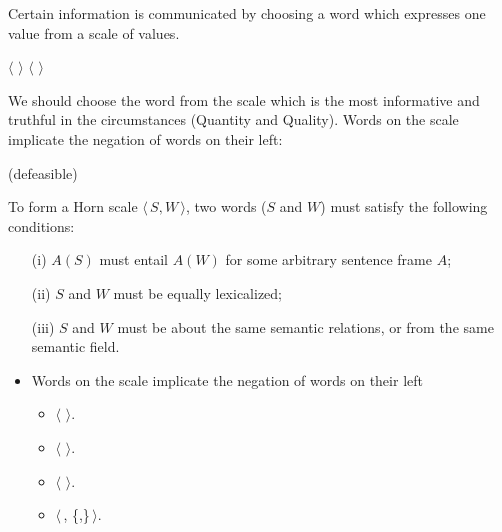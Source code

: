 \documentclass[a4paper,landscape,headrule,footrule,xetex]{foils}
\begin{document}
\newcommand{\horn}[1]{\ensuremath{\langle}\,#1\,\ensuremath{\rangle}}
\newcommand{\set}[1]{\{#1\}}

Certain information is communicated by choosing a word which
expresses one value from a scale of values. 

\begin{exe}
  \ex	$\langle$  $\rangle$
  \ex	$\langle$  $\rangle$
\end{exe}

We should choose the word from the scale which is the most informative
and truthful in the circumstances (Quantity and Quality).  Words on
the scale implicate the negation of words on their left: 

\begin{exe}
  \ex {}
  \ex {}
  \ex	{} \hfill (defeasible)
\end{exe}

 To form a
Horn scale \horn{$S,W$}, two words ($S$ and $W$) must satisfy the following
conditions:
\begin{enumerate}\addtolength{\itemsep}{-2ex}
\item[(i)] $A(S)$ must entail $A(W)$ for some arbitrary sentence frame $A$;
\item[(ii)] $S$ and $W$ must be equally lexicalized;
\item[(iii)] $S$ and $W$ must be about the same semantic relations, or
  from the same semantic field. 
\end{enumerate}
  \begin{itemize}
\item Words on the scale implicate the negation of words on their left
  \begin{itemize}
  \item \horn{}.
  \item \horn{}.
  \item \horn{}.
  \item \horn{,  \set{,}}.
  \end{itemize}
\end{itemize}
\end{document}
